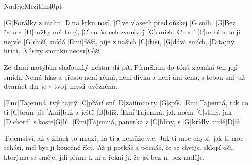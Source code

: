 \begin{song}{Naděje}{Mezitím}{40pt}

%
[G]Korálky z malin [D]na krku nosí, [C]ve vlasech předloňskej [G]sníh.
[G]Bez šatů a [D]nožky má bosý, [C]na ústech zvonivej [G]smích.
\rl Chodí [C]nahá a to jí nejvíc [G]sluší, snídá [Emi]déšť, pije z našich [C]duší,
[G]dává smích, [D]tajný hřích, [C]slzy smutku neosu[G]{}ší.\rr{}

%
Ze dlaní motýlům slaďounký nektar dá pít.
Písničkám do tónů zacinká ten její smích.
\rl Nemá hlas a přesto není němá, není dívka a není ani žena,
s tebou sní, už dvanáct dní je v tvojí mysli uvězněná.\rr{}

\verse{*}%
[Emi]Tajemná, tvý tajný [C]přání sní [D]zatímco ty [G]spíš.
[Emi]Tajemná, tak co ti [C]brání jít [Ami]blíž a ještě [D]blíž.
[Emi]Tajemná, jak noční [C]stíny, jak [D]chorál z koste[G]lů.
[Emi]Tajemná, panenka z [C]hlíny, s [G]křídly andě[D]lů.

%
Tajemství, až v žilách to mrazí, dá ti a nemůže víc.
Jak ti moc chybí, jak ti moc schází, měl bys jí konečně říct.
\rl Až ji potkáš a poznáš, že se chvěje, sklopí oči, kterýma se směje,
jdi přímo k ní a řekni jí, že jsi bez ní bez naděje.\rr{}
\end{song}
